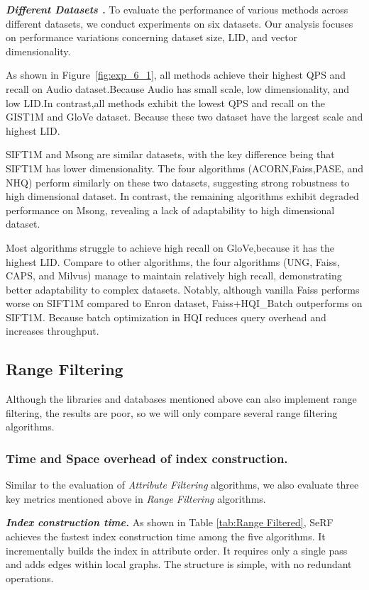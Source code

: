 \documentclass[sigconf, nonacm]{acmart}
\begin{document}
\begin{sloppypar}
\textit{\textbf{Different Datasets .}}  
To evaluate the performance of various methods across different datasets, we conduct experiments on six datasets. Our analysis focuses on performance variations concerning dataset size, LID, and vector dimensionality.

As shown in Figure~\ref{fig:exp_6_1}, all methods achieve their highest QPS and recall on Audio dataset.Because Audio has small scale, low dimensionality, and low LID.In contrast,all methods exhibit the lowest QPS and recall on the GIST1M and GloVe dataset. Because these two dataset have the largest scale and highest LID.

SIFT1M and Msong are similar datasets, with the key difference being that SIFT1M has lower dimensionality. The four algorithms (ACORN,Faiss,PASE, and NHQ) perform similarly on these two datasets, suggesting strong robustness to high dimensional dataset. In contrast, the remaining algorithms exhibit degraded performance on Msong, revealing a lack of adaptability to high dimensional dataset.

Most algorithms struggle to achieve high recall on GloVe,because it has the highest LID. Compare to other algorithms, the four algorithms (UNG, Faiss, CAPS, and Milvus) manage to maintain relatively high recall, demonstrating better adaptability to complex datasets. Notably, although vanilla Faiss performs worse on SIFT1M compared to Enron dataset, Faiss+HQI\_Batch outperforms on SIFT1M. Because batch optimization in HQI reduces query overhead and increases throughput.


\subsection{Range Filtering}
Although the libraries and databases mentioned above can also implement range filtering, the results are poor, so we will only compare several range filtering algorithms.
\subsubsection{Time and Space overhead of index construction.}


Similar to the evaluation of \textit{Attribute Filtering} algorithms, we also evaluate three key metrics mentioned above in \textit{Range Filtering} algorithms.

\textit{\textbf{Index construction time.}}
As shown in Table \ref{tab:Range Filtered}, SeRF achieves the fastest index construction time among the five algorithms. It incrementally builds the index in attribute order. It requires only a single pass and adds edges within local graphs. The structure is simple, with no redundant operations.


\end{sloppypar}
\end{document}
